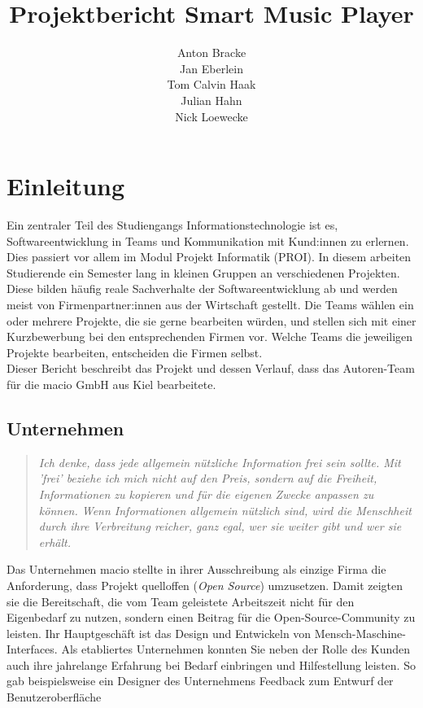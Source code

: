 \documentclass[10pt, a4paper]{article}
\title{Projektbericht Smart Music Player}
\author{Anton Bracke\\Jan Eberlein\\Tom Calvin Haak\\Julian Hahn\\Nick Loewecke}
\begin{document}
\maketitle
\newpage
\tableofcontents
\newpage

\section{Einleitung}
Ein zentraler Teil des Studiengangs \glqq Informationstechnologie\grqq{} ist es, Softwareentwicklung in Teams und Kommunikation mit Kund:innen zu erlernen. \cite{Qualifikationsziele_Informationstechnologie}
Dies passiert vor allem im Modul \glqq Projekt Informatik (PROI)\grqq{}.
In diesem arbeiten Studierende ein Semester lang in kleinen Gruppen an verschiedenen Projekten.
Diese bilden häufig reale Sachverhalte der Softwareentwicklung ab und werden meist von Firmenpartner:innen aus der Wirtschaft gestellt.
Die Teams wählen ein oder mehrere Projekte, die sie gerne bearbeiten würden, und stellen sich mit einer Kurzbewerbung bei den entsprechenden Firmen vor.
Welche Teams die jeweiligen Projekte bearbeiten, entscheiden die Firmen selbst.
\\
Dieser Bericht beschreibt das Projekt und dessen Verlauf, dass das Autoren-Team für die macio GmbH aus Kiel bearbeitete.

\subsection{Unternehmen}
\begin{quote}
  \textit{Ich denke, dass jede allgemein nützliche Information frei sein sollte. Mit 'frei' beziehe ich mich nicht auf den Preis, sondern auf die Freiheit, Informationen zu kopieren und für die eigenen Zwecke anpassen zu können. Wenn Informationen allgemein nützlich sind, wird die Menschheit durch ihre Verbreitung reicher, ganz egal, wer sie weiter gibt und wer sie erhält.}
  \cite{openSource}
\end{quote}

Das Unternehmen macio stellte in ihrer Ausschreibung als einzige Firma die Anforderung, dass Projekt quelloffen (\textit{Open Source}) umzusetzen. Damit zeigten sie die Bereitschaft, die vom Team geleistete Arbeitszeit nicht für den Eigenbedarf zu nutzen, sondern einen Beitrag für die Open-Source-Community zu leisten.
Ihr Hauptgeschäft ist das Design und Entwickeln von Mensch-Maschine-Interfaces. Als etabliertes Unternehmen konnten Sie neben der Rolle des Kunden auch ihre jahrelange Erfahrung bei Bedarf einbringen und Hilfestellung leisten. So gab beispielsweise ein Designer des Unternehmens Feedback zum Entwurf der Benutzeroberfläche
\end{document}

